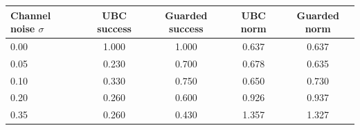 \begin{tabular}{lcccc}
\toprule
Channel noise $\sigma$ & UBC success & Guarded success & UBC norm & Guarded norm \\
\midrule
0.00 & 1.000 & 1.000 & 0.637 & 0.637 \\
0.05 & 0.230 & 0.700 & 0.678 & 0.635 \\
0.10 & 0.330 & 0.750 & 0.650 & 0.730 \\
0.20 & 0.260 & 0.600 & 0.926 & 0.937 \\
0.35 & 0.260 & 0.430 & 1.357 & 1.327 \\
\bottomrule
\end{tabular}
